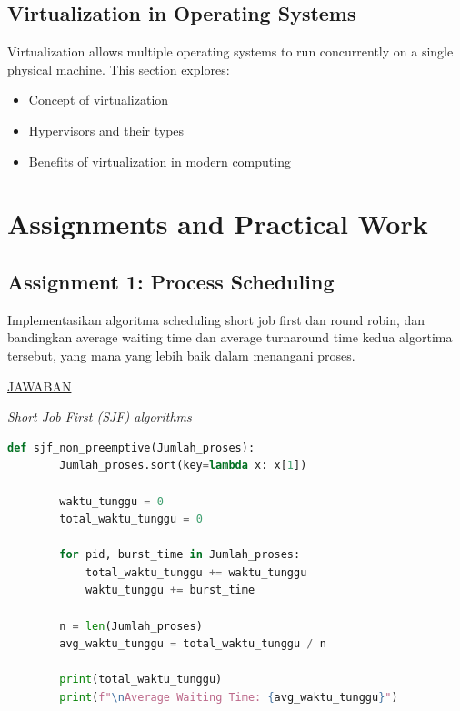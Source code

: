 \documentclass[12pt]{article}
\begin{document}
\subsection{Virtualization in Operating Systems}
Virtualization allows multiple operating systems to run concurrently on a single physical machine. This section explores:
\begin{itemize}
    \item Concept of virtualization
    \item Hypervisors and their types
    \item Benefits of virtualization in modern computing
\end{itemize}


\section{Assignments and Practical Work}
\subsection{Assignment 1: Process Scheduling}
\hspace*{1cm} Implementasikan algoritma scheduling short job first dan round robin, dan bandingkan average waiting time dan average turnaround time kedua algortima tersebut, yang mana yang lebih baik dalam menangani proses.
\newline
\newline

\begin{center}
    \underline{JAWABAN}
\end{center}

\textit{Short Job First (SJF) algorithms}
\begin{lstlisting}[language=Python]
    def sjf_non_preemptive(Jumlah_proses):
        Jumlah_proses.sort(key=lambda x: x[1])
    
        waktu_tunggu = 0
        total_waktu_tunggu = 0
    
        for pid, burst_time in Jumlah_proses:
            total_waktu_tunggu += waktu_tunggu
            waktu_tunggu += burst_time
    
        n = len(Jumlah_proses)
        avg_waktu_tunggu = total_waktu_tunggu / n
    
        print(total_waktu_tunggu)
        print(f"\nAverage Waiting Time: {avg_waktu_tunggu}")    
    
\end{lstlisting}
\end{document}
